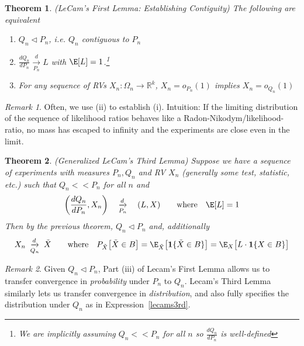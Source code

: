 \documentclass[12pt]{article}
\theoremstyle{plain}
\newtheorem{thm}{Theorem}[section]
\theoremstyle{definition}
\theoremstyle{remark}
\newtheorem*{rmk}{Remark}
\newcommand{\ra}{\rightarrow}
\newcommand{\Rk}{\mathbb{R}^k}
\newcommand{\dto}{\xrightarrow{d}}
\begin{document}
\begin{thm}\emph{(LeCam's First Lemma: Establishing Contiguity)}
\label{thm:lecams1st}
The following are equivalent
\begin{enumerate}[label=\emph{(\roman*)}]
  \item $Q_n \vartriangleleft P_n$, i.e. $Q_n$ contiguous to $P_n$
  \item $\frac{dQ_n}{dP_n}\underset{P_n}{\dto} L$ with
    $\E[L]=1$.\footnote{%
      We are implicitly assuming $Q_n<<P_n$ for all $n$ so
      $\frac{dQ_n}{dP_n}$ is well-defined
    }
  \item For any sequence of RVs $X_n:\Omega_n\ra\Rk$,
    $X_n = o_{P_n}(1)$
    implies
    $X_n = o_{Q_n}(1)$
\end{enumerate}
\end{thm}
\begin{rmk}
Often, we use (ii) to establish (i).
Intuition: If the limiting distribution of the sequence of likelihood
ratios behaves like a Radon-Nikodym/likelihood-ratio, no mass has
escaped to infinity and the experiments are close even in the limit.
\end{rmk}

\begin{thm}
\label{thm:lecams3rd}
\emph{(Generalized LeCam's Third Lemma)}
Suppose we have a sequence of experiments with measures $P_n,Q_n$ and
RV $X_n$ (generally some test, statistic, etc.) such that $Q_n<<P_n$ for
all $n$ and
\begin{align*}
  \left(\frac{dQ_n}{dP_n},X_n\right)
  \quad\underset{P_n}{\dto}\quad
  (L,X)
  \qquad \text{where}\quad
  \E[L]=1
\end{align*}
Then by the previous theorem, $Q_n\vartriangleleft P_n$ and,
additionally
\begin{align}
  X_n\;\underset{Q_n}{\dto}\;\tilde{X}
  \qquad \text{where}\quad
  P_{\tilde{X}}\big[\tilde{X}\in B\big]
  = \E_{\tilde{X}}\big[\mathbf{1}\{\tilde{X}\in B\}\big]
  =\E_X\big[L\cdot \mathbf{1}\{X\in B\}\big]
  \label{lecams3rd}
\end{align}
\end{thm}
\begin{rmk}
Given $Q_n\vartriangleleft P_n$, Part (iii) of Lecam's First Lemma
allows us to transfer convergence in \emph{probability} under $P_n$ to
$Q_n$.
Lecam's Third Lemma similarly lets us transfer convergence in
\emph{distribution}, and also fully specifies the distribution under
$Q_n$ as in Expression~\ref{lecams3rd}.
\end{rmk}
\end{document}
